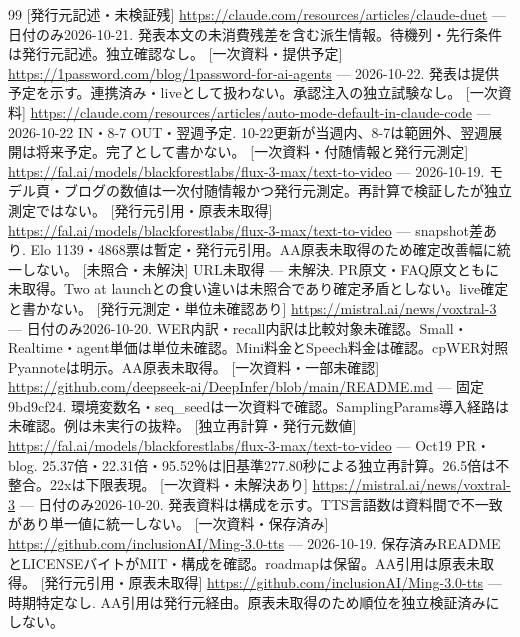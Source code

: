 \documentclass[lualatex,a4paper,10pt]{jlreq}
\begin{document}
{\begin{thebibliography}{99}
 [発行元記述・未検証残] \url{https://claude.com/resources/articles/claude-duet} --- 日付のみ2026-10-21. 発表本文の未消費残差を含む派生情報。待機列・先行条件は発行元記述。独立確認なし。
 [一次資料・提供予定] \url{https://1password.com/blog/1password-for-ai-agents} --- 2026-10-22. 発表は提供予定を示す。連携済み・liveとして扱わない。承認注入の独立試験なし。
 [一次資料] \url{https://claude.com/resources/articles/auto-mode-default-in-claude-code} --- 2026-10-22 IN・8-7 OUT・翌週予定. 10-22更新が当週内、8-7は範囲外、翌週展開は将来予定。完了として書かない。
 [一次資料・付随情報と発行元測定] \url{https://fal.ai/models/blackforestlabs/flux-3-max/text-to-video} --- 2026-10-19. モデル頁・ブログの数値は一次付随情報かつ発行元測定。再計算で検証したが独立測定ではない。
 [発行元引用・原表未取得] \url{https://fal.ai/models/blackforestlabs/flux-3-max/text-to-video} --- snapshot差あり. Elo 1139・4868票は暫定・発行元引用。AA原表未取得のため確定改善幅に統一しない。
 [未照合・未解決] URL未取得 --- 未解決. PR原文・FAQ原文ともに未取得。Two at launchとの食い違いは未照合であり確定矛盾としない。live確定と書かない。
 [発行元測定・単位未確認あり] \url{https://mistral.ai/news/voxtral-3} --- 日付のみ2026-10-20. WER内訳・recall内訳は比較対象未確認。Small・Realtime・agent単価は単位未確認。Mini料金とSpeech料金は確認。cpWER対照Pyannoteは明示。AA原表未取得。
 [一次資料・一部未確認] \url{https://github.com/deepseek-ai/DeepInfer/blob/main/README.md} --- 固定9bd9cf24. 環境変数名・seq\_seedは一次資料で確認。SamplingParams導入経路は未確認。例は未実行の抜粋。
 [独立再計算・発行元数値] \url{https://fal.ai/models/blackforestlabs/flux-3-max/text-to-video} --- Oct19 PR・blog. 25.37倍・22.31倍・95.52％は旧基準277.80秒による独立再計算。26.5倍は不整合。22xは下限表現。
 [一次資料・未解決あり] \url{https://mistral.ai/news/voxtral-3} --- 日付のみ2026-10-20. 発表資料は構成を示す。TTS言語数は資料間で不一致があり単一値に統一しない。
 [一次資料・保存済み] \url{https://github.com/inclusionAI/Ming-3.0-tts} --- 2026-10-19. 保存済みREADMEとLICENSEバイトがMIT・構成を確認。roadmapは保留。AA引用は原表未取得。
 [発行元引用・原表未取得] \url{https://github.com/inclusionAI/Ming-3.0-tts} --- 時期特定なし. AA引用は発行元経由。原表未取得のため順位を独立検証済みにしない。

\end{thebibliography}}
\end{document}
